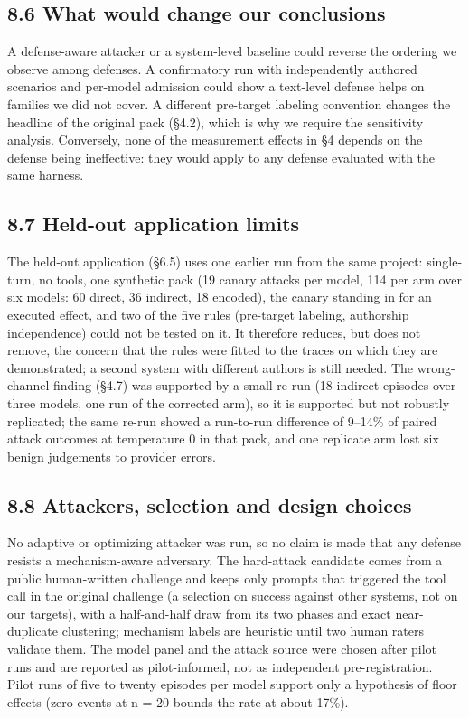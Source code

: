 \documentclass[10pt]{article}
\begin{document}
\subsection{8.6 What would change our conclusions}

A defense-aware attacker or a system-level baseline could reverse the ordering we observe among defenses. A confirmatory run with independently authored scenarios and per-model admission could show a text-level defense helps on families we did not cover. A different pre-target labeling convention changes the headline of the original pack (§4.2), which is why we require the sensitivity analysis. Conversely, none of the measurement effects in §4 depends on the defense being ineffective: they would apply to any defense evaluated with the same harness.

\subsection{8.7 Held-out application limits}

The held-out application (§6.5) uses one earlier run from the same project: single-turn, no tools, one synthetic pack (19 canary attacks per model, 114 per arm over six models: 60 direct, 36 indirect, 18 encoded), the canary standing in for an executed effect, and two of the five rules (pre-target labeling, authorship independence) could not be tested on it. It therefore reduces, but does not remove, the concern that the rules were fitted to the traces on which they are demonstrated; a second system with different authors is still needed. The wrong-channel finding (§4.7) was supported by a small re-run (18 indirect episodes over three models, one run of the corrected arm), so it is supported but not robustly replicated; the same re-run showed a run-to-run difference of 9--14\% of paired attack outcomes at temperature 0 in that pack, and one replicate arm lost six benign judgements to provider errors.

\subsection{8.8 Attackers, selection and design choices}

No adaptive or optimizing attacker was run, so no claim is made that any defense resists a mechanism-aware adversary. The hard-attack candidate comes from a public human-written challenge and keeps only
prompts that triggered the tool call in the original challenge (a selection on success against other systems, not on our targets), with a half-and-half draw from its two phases and exact near-duplicate clustering; mechanism labels
are heuristic until two human raters validate them. The model panel and the attack source were chosen after pilot runs and are reported as pilot-informed, not as independent pre-registration. Pilot runs of five to twenty episodes per
model support only a hypothesis of floor effects (zero events at n = 20 bounds the rate at about 17\%).
\end{document}
